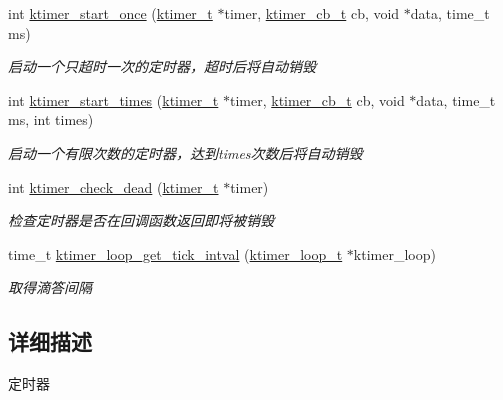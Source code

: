 \begin{DoxyCompactItemize}
int \hyperlink{a00139_ga9c37409260a72e3218ae4fcaf44d79bc_ga9c37409260a72e3218ae4fcaf44d79bc}{ktimer\+\_\+start\+\_\+once} (\hyperlink{a00066_a846172ea4e8a86449eca41a3d8e074b7_a846172ea4e8a86449eca41a3d8e074b7}{ktimer\+\_\+t} $\ast$timer, \hyperlink{a00066_a2333fd0f2c3a85faf586300ca40deed4_a2333fd0f2c3a85faf586300ca40deed4}{ktimer\+\_\+cb\+\_\+t} cb, void $\ast$data, time\+\_\+t ms)
\begin{DoxyCompactList}\small\item\em 启动一个只超时一次的定时器，超时后将自动销毁 \end{DoxyCompactList}\item 
int \hyperlink{a00139_ga285936846760d9f325e588d2e2105fe5_ga285936846760d9f325e588d2e2105fe5}{ktimer\+\_\+start\+\_\+times} (\hyperlink{a00066_a846172ea4e8a86449eca41a3d8e074b7_a846172ea4e8a86449eca41a3d8e074b7}{ktimer\+\_\+t} $\ast$timer, \hyperlink{a00066_a2333fd0f2c3a85faf586300ca40deed4_a2333fd0f2c3a85faf586300ca40deed4}{ktimer\+\_\+cb\+\_\+t} cb, void $\ast$data, time\+\_\+t ms, int times)
\begin{DoxyCompactList}\small\item\em 启动一个有限次数的定时器，达到times次数后将自动销毁 \end{DoxyCompactList}\item 
int \hyperlink{a00139_ga9387b99ff760183fe8b61c8c46d6efc8_ga9387b99ff760183fe8b61c8c46d6efc8}{ktimer\+\_\+check\+\_\+dead} (\hyperlink{a00066_a846172ea4e8a86449eca41a3d8e074b7_a846172ea4e8a86449eca41a3d8e074b7}{ktimer\+\_\+t} $\ast$timer)
\begin{DoxyCompactList}\small\item\em 检查定时器是否在回调函数返回即将被销毁 \end{DoxyCompactList}\item 
time\+\_\+t \hyperlink{a00139_ga71282c2dc8bac0935617b1271f4066e6_ga71282c2dc8bac0935617b1271f4066e6}{ktimer\+\_\+loop\+\_\+get\+\_\+tick\+\_\+intval} (\hyperlink{a00066_a024af2aa29615e7a811ea6c45438157d_a024af2aa29615e7a811ea6c45438157d}{ktimer\+\_\+loop\+\_\+t} $\ast$ktimer\+\_\+loop)
\begin{DoxyCompactList}\small\item\em 取得滴答间隔 \end{DoxyCompactList}\end{DoxyCompactItemize}


\subsection{详细描述}
定时器 


